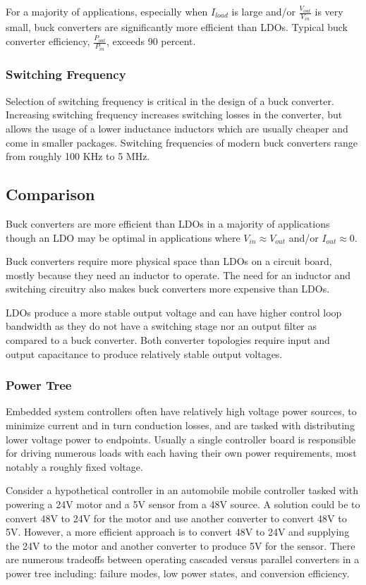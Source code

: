 \documentclass[main.tex]{subfiles}
\begin{document}
For a majority of applications, especially when $I_{load}$ is large and/or $\frac{V_{out}}{V_{in}}$ is very small, buck converters are significantly more efficient than LDOs. Typical buck converter efficiency, $\frac{P_{out}}{P_{in}}$, exceeds 90 percent.  

\subsubsection{Switching Frequency}
Selection of switching frequency is critical in the design of a buck converter. Increasing switching frequency increases switching losses in the converter, but allows the usage of a lower inductance inductors which are usually cheaper and come in smaller packages. Switching frequencies of modern buck converters range from roughly 100 KHz to 5 MHz. 

\subsection{Comparison}
Buck converters are more efficient than LDOs in a majority of applications though an LDO may be optimal in applications where $V_{in} \approx V_{out}$ and/or $I_{out} \approx 0$. 

Buck converters require more physical space than LDOs on a circuit board, mostly because they need an inductor to operate. The need for an inductor and switching circuitry also makes buck converters more expensive than LDOs. 

LDOs produce a more stable output voltage and can have higher control loop bandwidth as they do not have a switching stage nor an output filter as compared to a buck converter. Both converter topologies require input and output capacitance to produce relatively stable output voltages.

\subsubsection{Power Tree}
Embedded system controllers often have relatively high voltage power sources, to minimize current and in turn conduction losses, and are tasked with distributing lower voltage power to endpoints. Usually a single controller board is responsible for driving numerous loads with each having their own power requirements, most notably a roughly fixed voltage. 

Consider a hypothetical controller in an automobile mobile controller tasked with powering a 24V motor and a 5V sensor from a 48V source. A solution could be to convert 48V to 24V for the motor and use another converter to convert 48V to 5V. However, a more efficient approach is to convert 48V to 24V and supplying the 24V to the motor and another converter to produce 5V for the sensor. There are numerous tradeoffs between operating cascaded versus parallel converters in a power tree including: failure modes, low power states, and conversion efficiency. 
\end{document}
